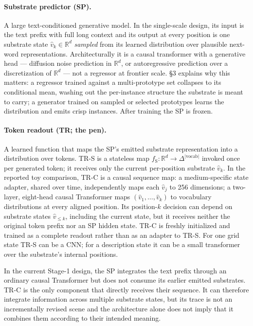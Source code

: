 \documentclass[11pt,a4paper]{article}
\begin{document}
\paragraph{Substrate predictor (SP).} A large text-conditioned generative model. In the single-scale design, its input is the text prefix with full long context and its output at every position is one substrate state $\hat{v}_k \in \mathbb{R}^d$ \emph{sampled} from its learned distribution over plausible next-word representations. Architecturally it is a causal transformer with a generative head --- diffusion noise prediction in $\mathbb{R}^d$, or autoregressive prediction over a discretization of $\mathbb{R}^d$ --- not a regressor at frontier scale. §3 explains why this matters: a regressor trained against a multi-prototype set collapses to its conditional mean, washing out the per-instance structure the substrate is meant to carry; a generator trained on sampled or selected prototypes learns the distribution and emits crisp instances. After training the SP is frozen.

\paragraph{Token readout (TR; the pen).} A learned function that maps the SP's emitted substrate representation into a distribution over tokens. TR-S is a stateless map $f_{\mathrm{S}}: \mathbb{R}^d \to \Delta^{|\text{vocab}|}$ invoked once per generated token; it receives only the current per-position substrate $\hat v_k$. In the reported toy comparison, TR-C is a causal sequence map: a medium-specific state adapter, shared over time, independently maps each $\hat v_j$ to 256 dimensions; a two-layer, eight-head causal Transformer maps $(\hat v_1,\ldots,\hat v_k)$ to vocabulary distributions at every aligned position. Its position-$k$ decision can depend on substrate states $\hat v_{\leq k}$, including the current state, but it receives neither the original token prefix nor an SP hidden state. TR-C is freshly initialized and trained as a complete readout rather than as an adapter to TR-S. For one grid state TR-S can be a CNN; for a description state it can be a small transformer over the substrate's internal positions.

In the current Stage-1 design, the SP integrates the text prefix through an ordinary causal Transformer but does not consume its earlier emitted substrates. TR-C is the only component that directly receives their sequence. It can therefore integrate information across multiple substrate states, but its trace is not an incrementally revised scene and the architecture alone does not imply that it combines them according to their intended meaning.
\end{document}
